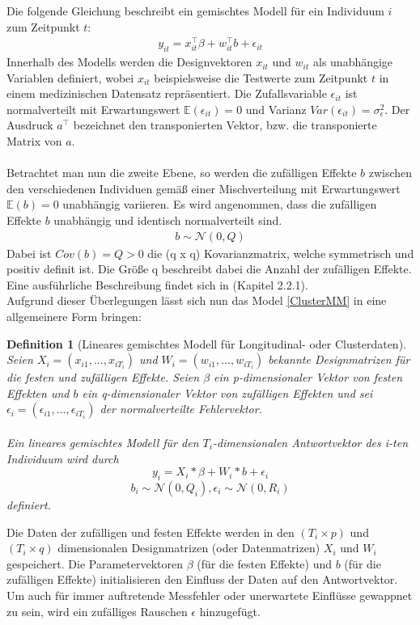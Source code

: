 \documentclass[%
thesis=student,%
coverpage=false,%
titlepage=false,%
headmarks=true, %
german,%
font=libertine, %
math=newpxtx, %
BCOR=5mm,%
coverBCOR=11mm%
]{tumbook}
\theoremstyle{break}
\newtheorem{definition}{Definition}[section]
\begin{document}
Die folgende Gleichung beschreibt ein gemischtes Modell für ein Individuum $i$ zum Zeitpunkt $t$:
\begin{align} 
	y_{it} = x^{\top}_{it}\beta + w^{\top}_{it}b + \epsilon_{it} \label{ClusterMM}
\end{align} \noindent
Innerhalb des Modells werden die Designvektoren $x_{it}$ und $w_{it}$ als unabhängige Variablen definiert, wobei $x_{it}$ beispielsweise die Testwerte zum Zeitpunkt $t$ in einem medizinischen Datensatz repräsentiert. Die Zufallsvariable $\epsilon_{it}$ ist normalverteilt mit Erwartungswert $ \mathbb{E}(\epsilon_{it}) = 0$ und Varianz $Var(\epsilon_{it}) = \sigma_\epsilon^2$.  Der Ausdruck $a^{\top}$ bezeichnet den transponierten Vektor, bzw. die transponierte Matrix von $a$.\\
\\
Betrachtet man nun die zweite Ebene, so werden die zufälligen Effekte $b$ zwischen den verschiedenen Individuen gemäß einer Mischverteilung mit Erwartungswert $ \mathbb{E}(b)=0$ unabhängig variieren. Es wird angenommen, dass die zufälligen Effekte $b$ unabhängig und identisch normalverteilt sind.
\begin{align}
	b \sim \mathcal{N}(0,Q)
\end{align}\noindent
Dabei ist $Cov(b) = Q > 0$ die (q x q) Kovarianzmatrix, welche symmetrisch und positiv definit ist. Die Größe q beschreibt dabei die Anzahl der zufälligen Effekte. Eine ausführliche Beschreibung findet sich in \cite{pinheiro2000} (Kapitel 2.2.1).
\\
Aufgrund dieser Überlegungen lässt sich nun das Model \ref{ClusterMM} in eine allgemeinere Form bringen:
\begin{definition}[Lineares gemischtes Modell für Longitudinal- oder Clusterdaten] \label{LMM für longitudinale Daten}
	Seien $X_i = (x_{i1}, ..., x_{iT_i})$  und $W_i = (w_{i1},...,w_{iT_i})$ bekannte Designmatrizen für die festen und zufälligen Effekte. Seien $\beta$ ein p-dimensionaler Vektor von festen Effekten und $b$ ein q-dimensionaler Vektor von zufälligen Effekten und sei $\epsilon_i = (\epsilon_{i1},...,\epsilon_{iT_i})$ der normalverteilte Fehlervektor.\\
	\\
	Ein lineares gemischtes Modell für den $T_i$-dimensionalen Antwortvektor des i-ten Individuum wird durch 
	$$y_i = X_i * \beta + W_i * b + \epsilon_i$$ 
	$$b_i \sim \mathcal{N}(0,Q_i), \epsilon_i \sim \mathcal{N}(0,R_i)$$
	definiert.
\end{definition}\noindent
Die Daten der zufälligen und festen Effekte werden in den $(T_i \times p)$ und $(T_i \times q)$ dimensionalen  Designmatrizen (oder Datenmatrizen) $X_i$ und $W_i$  gespeichert. Die Parametervektoren $\beta$ (für die festen Effekte) und $b$ (für die zufälligen Effekte) initialisieren den Einfluss der Daten auf den Antwortvektor. Um auch für immer auftretende Messfehler oder unerwartete Einflüsse gewappnet zu sein, wird ein zufälliges Rauschen $\epsilon$ hinzugefügt. 
\end{document}
